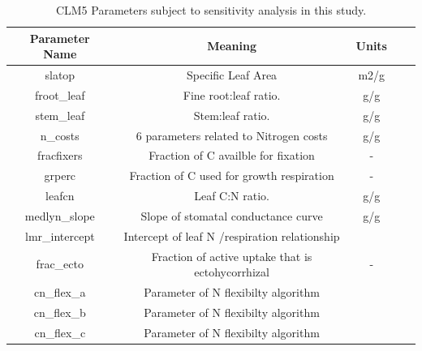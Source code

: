 \documentclass[draft,linenumbers]{agujournal}
\begin{document}
\pagebreak
\begin{table}
\begin{center}
\begin{tabular}{ |c|c|c|c|c| } 
 \hline
 Parameter Name & Meaning & Units \\
  \hline
 slatop & Specific Leaf Area & m2/g \\ 
 froot\_leaf & Fine root:leaf ratio. & g/g \\
 stem\_leaf  & Stem:leaf ratio. & g/g \\ 
 n\_costs    & 6 parameters related to Nitrogen costs & g/g \\
 fracfixers  & Fraction of C availble for fixation & - \\
  grperc  & Fraction of C used for growth respiration  & - \\
  leafcn  & Leaf C:N ratio. & g/g \\
     medlyn\_slope  & Slope of stomatal conductance curve & g/g \\
      lmr\_intercept & Intercept of leaf N /respiration relationship & \\
      frac\_ecto & Fraction of active uptake that is ectohycorrhizal & - \\
      cn\_flex\_a & Parameter of N flexibilty algorithm& \\
      cn\_flex\_b & Parameter of N flexibilty algorithm & \\
      cn\_flex\_c & Parameter of N flexibilty algorithm & \\
\hline
\end{tabular}
\end{center}
\caption{CLM5 Parameters subject to sensitivity analysis in this study. }
\label{table_parameters}
\end{table}
\end{document}
